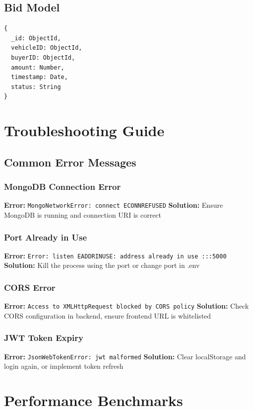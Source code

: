 \subsection{Bid Model}
\begin{verbatim}
{
  _id: ObjectId,
  vehicleID: ObjectId,
  buyerID: ObjectId,
  amount: Number,
  timestamp: Date,
  status: String
}
\end{verbatim}

\section{Troubleshooting Guide}

\subsection{Common Error Messages}

\subsubsection{MongoDB Connection Error}
\textbf{Error:} \texttt{MongoNetworkError: connect ECONNREFUSED}
\textbf{Solution:} Ensure MongoDB is running and connection URI is correct

\subsubsection{Port Already in Use}
\textbf{Error:} \texttt{Error: listen EADDRINUSE: address already in use :::5000}
\textbf{Solution:} Kill the process using the port or change port in .env

\subsubsection{CORS Error}
\textbf{Error:} \texttt{Access to XMLHttpRequest blocked by CORS policy}
\textbf{Solution:} Check CORS configuration in backend, ensure frontend URL is whitelisted

\subsubsection{JWT Token Expiry}
\textbf{Error:} \texttt{JsonWebTokenError: jwt malformed}
\textbf{Solution:} Clear localStorage and login again, or implement token refresh

\section{Performance Benchmarks}

